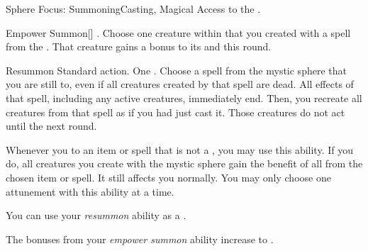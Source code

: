     \begin{magicalfeat}{Sphere Focus: Summoning}{Casting, Magical}
        \featpre Access to the  .

        \begin{magicalactiveability}{Empower Summon}[]
            \abilityusagetime {}.
            \rankline
            Choose one creature within \medrange that you created with a spell from the  .
            That creature gains a  bonus to its  and  this round.
        \end{magicalactiveability}

        \begin{magicalactiveability}{Resummon}
            \abilityusagetime Standard action.
            \abilitycost One .
            \rankline
            Choose a spell from the  mystic sphere that you are still  to, even if all creatures created by that spell are dead.
            All effects of that spell, including any active creatures, immediately end.
            Then, you recreate all creatures from that spell as if you had just cast it.
            Those creatures do not act until the next round.
        \end{magicalactiveability}

         Whenever you  to an item or spell that is not a , you may use this ability.
        If you do, all creatures you create with the  mystic sphere gain the benefit of all  from the chosen item or spell.
        It still affects you normally.
        You may only choose one attunement with this ability at a time.

         You can use your \textit{resummon} ability as a .

         The bonuses from your \textit{empower summon} ability increase to .
    \end{magicalfeat}

